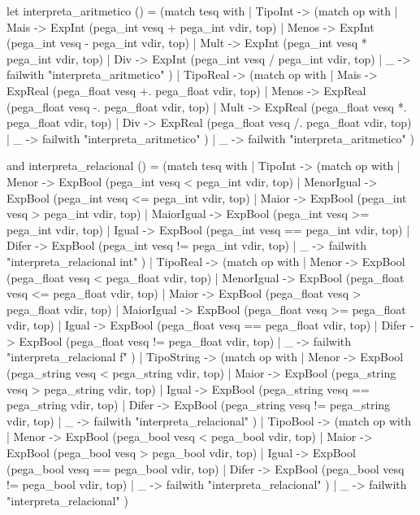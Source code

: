 \documentclass[12pt,a4paper,twoside]{article}
\begin{document}
\begin{terminal}
    let interpreta_aritmetico () =
      (match tesq with
       | TipoInt ->
         (match op with
          | Mais  -> ExpInt (pega_int vesq + pega_int vdir, top)
          | Menos -> ExpInt (pega_int vesq - pega_int vdir, top)
          | Mult  -> ExpInt (pega_int vesq * pega_int vdir, top)
          | Div   -> ExpInt (pega_int vesq / pega_int vdir, top)
          | _ -> failwith "interpreta_aritmetico"
         )
       | TipoReal ->
         (match op with
          | Mais  -> ExpReal (pega_float vesq +. pega_float vdir, top)
          | Menos -> ExpReal (pega_float vesq -. pega_float vdir, top)
          | Mult  -> ExpReal (pega_float vesq *. pega_float vdir, top)
          | Div   -> ExpReal (pega_float vesq /. pega_float vdir, top)
          | _ -> failwith "interpreta_aritmetico"
         )
       | _ -> failwith "interpreta_aritmetico"
      )

    and interpreta_relacional () =
      (match tesq with
       | TipoInt ->
         (match op with
          | Menor -> ExpBool (pega_int vesq < pega_int vdir, top)
          | MenorIgual -> ExpBool (pega_int vesq <= pega_int vdir, top)
          | Maior  -> ExpBool (pega_int vesq > pega_int vdir, top)
          | MaiorIgual  -> ExpBool (pega_int vesq >= pega_int vdir, top)
          | Igual   -> ExpBool (pega_int vesq == pega_int vdir, top)
          | Difer   -> ExpBool (pega_int vesq != pega_int vdir, top)
          | _ -> failwith "interpreta_relacional int"
         )
       | TipoReal ->
         (match op with
          | Menor -> ExpBool (pega_float vesq < pega_float vdir, top)
          | MenorIgual -> ExpBool (pega_float vesq <= pega_float vdir, top)
          | Maior  -> ExpBool (pega_float vesq > pega_float vdir, top)
          | MaiorIgual  -> ExpBool (pega_float vesq >= pega_float vdir, top)
          | Igual   -> ExpBool (pega_float vesq == pega_float vdir, top)
          | Difer   -> ExpBool (pega_float vesq != pega_float vdir, top)
          | _ -> failwith "interpreta_relacional f"
         )
       | TipoString ->
         (match op with
          | Menor -> ExpBool (pega_string vesq < pega_string vdir, top)
          | Maior  -> ExpBool (pega_string vesq > pega_string vdir, top)
          | Igual   -> ExpBool (pega_string vesq == pega_string vdir, top)
          | Difer   -> ExpBool (pega_string vesq != pega_string vdir, top)
          | _ -> failwith "interpreta_relacional"
         )
       | TipoBool ->
         (match op with
          | Menor -> ExpBool (pega_bool vesq < pega_bool vdir, top)
          | Maior  -> ExpBool (pega_bool vesq > pega_bool vdir, top)
          | Igual   -> ExpBool (pega_bool vesq == pega_bool vdir, top)
          | Difer   -> ExpBool (pega_bool vesq != pega_bool vdir, top)
          | _ -> failwith "interpreta_relacional"
         )
       | _ ->  failwith "interpreta_relacional"
      )


\end{terminal}
\end{document}
